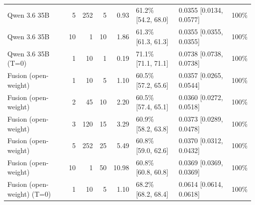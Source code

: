 \begin{table}[htbp]
{\begin{tabular}{lrrrrllr}
  Qwen 3.6 35B & 5 & 252 & 5 & 0.93 & 61.2\% \tiny[54.2, 68.0] & 0.0355 \tiny[0.0134, 0.0577] & 100\% \\
  Qwen 3.6 35B & 10 & 1 & 10 & 1.86 & 61.3\% \tiny[61.3, 61.3] & 0.0355 \tiny[0.0355, 0.0355] & 100\% \\
  Qwen 3.6 35B (T=0) & 1 & 10 & 1 & 0.19 & 71.1\% \tiny[71.1, 71.1] & 0.0738 \tiny[0.0738, 0.0738] & 100\% \\
\midrule
  Fusion (open-weight) & 1 & 10 & 5 & 1.10 & 60.5\% \tiny[57.2, 65.6] & 0.0357 \tiny[0.0265, 0.0544] & 100\% \\
  Fusion (open-weight) & 2 & 45 & 10 & 2.20 & 60.5\% \tiny[57.4, 65.1] & 0.0360 \tiny[0.0272, 0.0518] & 100\% \\
  Fusion (open-weight) & 3 & 120 & 15 & 3.29 & 60.9\% \tiny[58.2, 63.8] & 0.0373 \tiny[0.0289, 0.0478] & 100\% \\
  Fusion (open-weight) & 5 & 252 & 25 & 5.49 & 60.8\% \tiny[59.0, 62.6] & 0.0370 \tiny[0.0312, 0.0432] & 100\% \\
  Fusion (open-weight) & 10 & 1 & 50 & 10.98 & 60.8\% \tiny[60.8, 60.8] & 0.0369 \tiny[0.0369, 0.0369] & 100\% \\
  Fusion (open-weight) (T=0) & 1 & 10 & 5 & 1.10 & 68.2\% \tiny[68.2, 68.4] & 0.0614 \tiny[0.0614, 0.0618] & 100\% \\
\bottomrule
\end{tabular}%
}
\end{table}
